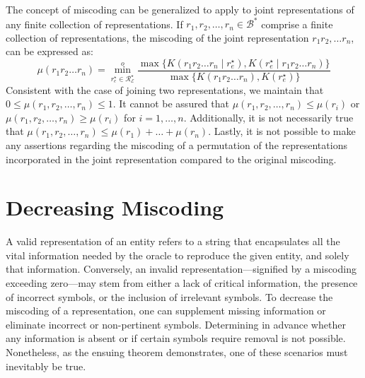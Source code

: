 The concept of miscoding can be generalized to apply to joint representations of any finite collection of representations. If $r_1, r_2, \ldots, r_n \in \mathcal{B}^\ast$ comprise a finite collection of representations, the miscoding of the joint representation $r_1 r_2, \ldots r_n$, can be expressed as:
\[
\mu(r_1 r_2 \ldots r_n) = \overset{o}{ \underset{ r^\star_e \in \mathcal{R}^\star_\mathcal{E} } \min} \frac{ \max\{ K \left( r_1 r_2 \ldots r_n \mid r^\star_e \right), K \left( r^\star_e \mid r_1 r_2 \ldots r_n \right) \} } { \max\{ K \left( r_1 r_2 \ldots r_n \right), K \left( r^\star_e \right) \} }
\]
Consistent with the case of joining two representations, we maintain that $0 \leq \mu(r_1, r_2, \ldots, r_n) \leq 1$. It cannot be assured that $\mu(r_1, r_2, \ldots, r_n) \leq \mu(r_i)$ or $\mu(r_1, r_2, \ldots, r_n) \geq \mu(r_i)$ for $i = 1, \ldots, n$. Additionally, it is not necessarily true that $\mu(r_1, r_2, \ldots, r_n) \leq \mu(r_1) + \ldots + \mu(r_n)$. Lastly, it is not possible to make any assertions regarding the miscoding of a permutation of the representations incorporated in the joint representation compared to the original miscoding.

%
%

\section{Decreasing Miscoding}

A valid representation of an entity refers to a string that encapsulates all the vital information needed by the oracle to reproduce the given entity, and solely that information. Conversely, an invalid representation—signified by a miscoding exceeding zero—may stem from either a lack of critical information, the presence of incorrect symbols, or the inclusion of irrelevant symbols. To decrease the miscoding of a representation, one can supplement missing information or eliminate incorrect or non-pertinent symbols. Determining in advance whether any information is absent or if certain symbols require removal is not possible. Nonetheless, as the ensuing theorem demonstrates, one of these scenarios must inevitably be true.

